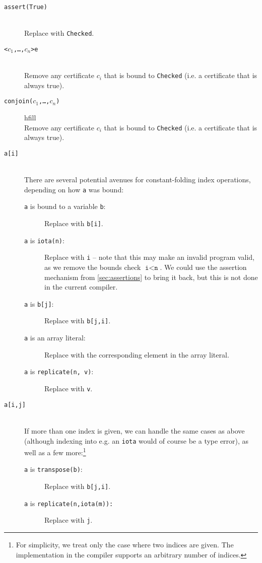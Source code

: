 \begin{description}
  \item[\texttt{assert(True)}]\hfill\\
    Replace with \texttt{Checked}.

  \item[\texttt{<$c_{1}$,\ldots,$c_{n}$>e}]\hfill\\
    Remove any certificate $c_{i}$ that is bound to \texttt{Checked}
    (i.e. a certificate that is always true).

  \item[\texttt{conjoin($c_{1}$,\ldots,$c_{n}$)}]hfill\\
    Remove any certificate $c_{i}$ that is bound to \texttt{Checked}
    (i.e. a certificate that is always true).

  \item[\texttt{a[i]}]\hfill\\
    There are several potential avenues for constant-folding index
    operations, depending on how \texttt{a} was bound:
    \begin{description}
    \item[\texttt{a} is bound to a variable \texttt{b}:] Replace with \texttt{b[i]}.

    \item[\texttt{a} is \texttt{iota(n)}:] Replace with \texttt{i} --
      note that this may make an invalid program valid, as we remove
      the bounds check $\texttt{i}<\texttt{n}$.  We could use the
      assertion mechanism from \cref{sec:assertions} to bring it back,
      but this is not done in the current compiler.

    \item[\texttt{a} is \texttt{b[j]}:] Replace with \texttt{b[j,i]}.

    \item[\texttt{a} is an array literal:] Replace with the
      corresponding element in the array literal.

    \item[\texttt{a} is \texttt{replicate(n, v)}:] Replace with
      \texttt{v}.
    \end{description}

  \item[\texttt{a[i,j]}]\hfill\\
    If more than one index is given, we can handle the same cases as
    above (although indexing into e.g. an \texttt{iota} would of
    course be a type error), as well as a few more:\footnote{For
      simplicity, we treat only the case where two indices are given.
      The implementation in the \LO{} compiler supports an arbitrary
      number of indices.}
    \begin{description}
    \item[\texttt{a} is \texttt{transpose(b)}:] Replace with
      \texttt{b[j,i]}.
    \item[\texttt{a} is \texttt{replicate(n,iota(m)):}] Replace with
      \texttt{j}.
    \end{description}
\end{description}

